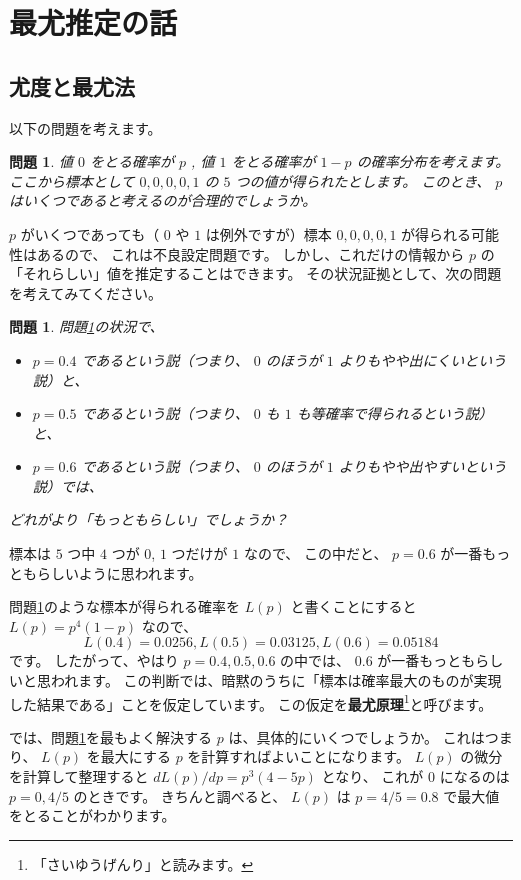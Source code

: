 \documentclass[uplatex,dvipdfmx]{jsarticle}
\newtheorem{prob}[thm]{問題}
\begin{document}
\section{最尤推定の話}
\subsection{尤度と最尤法}
  以下の問題を考えます。

  \begin{prob}
    \label{prob:likelihood}
    値 $0$ をとる確率が $p$ , 値 $1$ をとる確率が $1-p$ の確率分布を考えます。
    ここから標本として $0, 0, 0, 0, 1$ の $5$ つの値が得られたとします。
    このとき、 $p$ はいくつであると考えるのが合理的でしょうか。
  \end{prob}
  
  $p$ がいくつであっても（ $0$ や $1$ は例外ですが）標本 $0, 0, 0, 0, 1$ が得られる可能性はあるので、
  これは不良設定問題です。
  しかし、これだけの情報から $p$ の「それらしい」値を推定することはできます。
  その状況証拠として、次の問題を考えてみてください。

  \begin{prob}
    問題\ref{prob:likelihood}の状況で、
    \begin{itemize}
      \item $p = 0.4$ であるという説（つまり、 $0$ のほうが $1$ よりもやや出にくいという説）と、
      \item $p = 0.5$ であるという説（つまり、 $0$ も $1$ も等確率で得られるという説）と、
      \item $p = 0.6$ であるという説（つまり、 $0$ のほうが $1$ よりもやや出やすいという説）では、
    \end{itemize}
    どれがより「もっともらしい」でしょうか？
  \end{prob}
  
  標本は $5$ つ中 $4$ つが $0$, $1$ つだけが $1$ なので、
  この中だと、 $p = 0.6$ が一番もっともらしいように思われます。

  問題\ref{prob:likelihood}のような標本が得られる確率を $L(p)$ と書くことにすると
  $L(p) = p^4(1-p)$ なので、
  \[
    L(0.4) = 0.0256, L(0.5) = 0.03125, L(0.6) = 0.05184
  \]
  です。
  したがって、やはり $p = 0.4, 0.5, 0.6$ の中では、 $0.6$ が一番もっともらしいと思われます。
  この判断では、暗黙のうちに「標本は確率最大のものが実現した結果である」ことを仮定しています。
  この仮定を\textbf{最尤原理}\footnote{「さいゆうげんり」と読みます。}と呼びます。

  では、問題\ref{prob:likelihood}を最もよく解決する $p$ は、具体的にいくつでしょうか。
  これはつまり、 $L(p)$ を最大にする $p$ を計算すればよいことになります。
  $L(p)$ の微分を計算して整理すると $dL(p)/dp = p^3(4-5p)$ となり、
  これが $0$ になるのは $p = 0, 4/5$ のときです。
  きちんと調べると、 $L(p)$ は $p = 4/5 = 0.8$ で最大値をとることがわかります。
\end{document}
